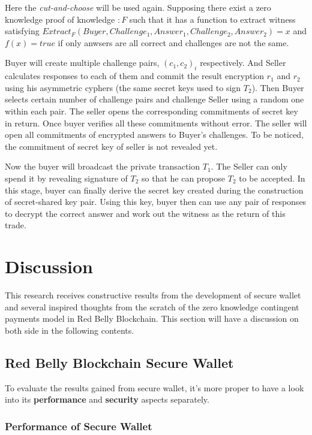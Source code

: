 \documentclass[12pt]{article}
\begin{document}
Here the \textit{cut-and-choose} will be used again. Supposing there exist a zero knowledge proof of knowledge $\mathcolon{F}$ such that it has a function to extract witness satisfying ${Extract_F}(Buyer, {Challenge_1}, {Answer_1}, {Challenge_2}, {Answer_2}) = x$ and $f(x) = true$ if only anwsers are all correct and challenges are not the same. 

Buyer will create multiple challenge pairs, ${({c_1}, {c_2})_i}$ respectively. And Seller calculates responses to each of them and commit the result encryption ${r_1}$ and ${r_2}$ using his asymmetric cyphers (the same secret keys used to sign ${T_2}$). Then Buyer selects certain number of challenge pairs and challenge Seller using a random one within each pair. The seller opens the corresponding commitments of secret key in return. Once buyer verifies all these commitments without error. The seller will open all commitments of encrypted answers to Buyer’s challenges. To be noticed, the commitment of secret key of seller is not revealed yet.

Now the buyer will broadcast the private transaction ${T_1}$. The Seller can only spend it by revealing signature of ${T_2}$ so that he can propose ${T_2}$ to be accepted. In this stage, buyer can finally derive the secret key created during the construction of secret-shared key pair. Using this key, buyer then can use any pair of responses to decrypt the correct answer and work out the witness as the return of this trade.


\section{Discussion}

This research receives constructive results from the development of secure wallet and several inspired thoughts from the scratch of the zero knowledge contingent payments model in Red Belly Blockchain. This section will have a discussion on both side in the following contents.

\subsection{Red Belly Blockchain Secure Wallet}

To evaluate the results gained from secure wallet, it's more proper to have a look into its \textbf{performance} and \textbf{security} aspects separately.

\subsubsection{Performance of Secure Wallet}
\end{document}
